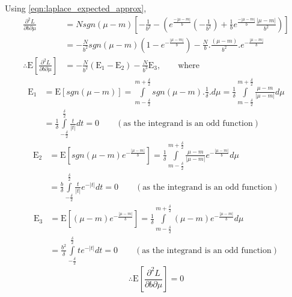 \documentclass[wcp]{jmlr}
\begin{document}
Using \eqref{eqn:laplace_expected_approx}, 
\begin{align*}
 \frac{\partial^2 L}{\partial b \partial \mu} &= N sgn(\mu-m) \left[ -\frac{1}{b^2} - \left( e^{\frac{-|\mu-m|}{b}} \left( -\frac{1}{b^2} \right) + \frac{1}{b} e^{\frac{-|\mu-m|}{b}} \frac{|\mu-m|}{b^2} \right) \right] \\
 &= -\frac{N}{b^2} sgn(\mu-m)(1-e^{-\frac{|\mu-m|}{b}}) - \frac{N}{b} . \frac{(\mu-m)}{b^2} . e^{-\frac{|\mu-m|}{b}} \\
 \therefore \mathrm{E} \left[\frac{\partial^2 L}{\partial b \partial \mu}\right] &= -\frac{N}{b^2} (\mathrm{E}_1 - \mathrm{E}_2) - \frac{N}{b^3} \mathrm{E}_3, \quad\quad\mathrm{where}
\end{align*}
\begin{align*}
 \mathrm{E}_1 &= \mathrm{E}[sgn(\mu-m)] = \int\limits_{m-\frac{\delta}{2}}^{m+\frac{\delta}{2}} sgn(\mu-m).\frac{1}{\delta}.d\mu = \frac{1}{\delta} \int\limits_{m-\frac{\delta}{2}}^{m+\frac{\delta}{2}} \frac{\mu-m}{|\mu-m|} d\mu \\
 &= \frac{1}{\delta} \int\limits_{-\frac{\delta}{2}}^{\frac{\delta}{2}} \frac{t}{|t|} dt = 0 \quad\quad(\mathrm{as\,\,the\,\,integrand\,\,is\,\,an\,\,odd\,\,function})
\end{align*}
\begin{align*}
 \mathrm{E}_2 &= \mathrm{E}[sgn(\mu-m)e^{-\frac{|\mu-m|}{b}}] = \frac{1}{\delta} \int\limits_{m-\frac{\delta}{2}}^{m+\frac{\delta}{2}} \frac{\mu-m}{|\mu-m|} e^{-\frac{|\mu-m|}{b}} d\mu \\
 &= \frac{b}{\delta} \int\limits_{-\frac{\delta}{2}}^{\frac{\delta}{2}} \frac{t}{|t|} e^{-|t|} dt = 0 \quad\quad(\mathrm{as\,\,the\,\,integrand\,\,is\,\,an\,\,odd\,\,function})
\end{align*}
\begin{align*}
 \mathrm{E}_3 &= \mathrm{E}[(\mu-m)e^{-\frac{|\mu-m|}{b}}] = \frac{1}{\delta} \int\limits_{m-\frac{\delta}{2}}^{m+\frac{\delta}{2}} (\mu-m)e^{-\frac{|\mu-m|}{b}} d\mu \\
 &= \frac{b^2}{\delta} \int\limits_{-\frac{\delta}{2}}^{\frac{\delta}{2}} t e^{-|t|} dt = 0 \quad\quad(\mathrm{as\,\,the\,\,integrand\,\,is\,\,an\,\,odd\,\,function})
\end{align*}
\begin{equation*} 
  \therefore \mathrm{E} \left[\frac{\partial^2 L}{\partial b \partial \mu}\right] = 0 
\end{equation*}
\end{document}
